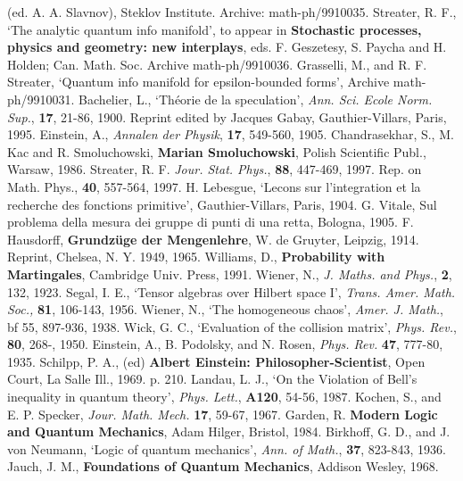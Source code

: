 \begin{thebibliography}{99}
(ed. A. A. Slavnov), Steklov Institute. Archive: math-ph/9910035.
 Streater, R. F., `The analytic quantum info manifold',
to appear in {\bf Stochastic processes, physics and geometry: new
interplays}, eds. F. Geszetesy, S. Paycha and H. Holden; Can. Math. Soc.
Archive math-ph/9910036.
 Grasselli, M., and R. F. Streater, `Quantum info manifold
for epsilon-bounded forms', Archive math-ph/9910031.
 Bachelier, L., `Th\'{e}orie de la speculation',
{\em Ann. Sci. Ecole Norm. Sup.}, {\bf 17}, 21-86, 1900. Reprint
edited by Jacques Gabay, Gauthier-Villars, Paris, 1995.
 Einstein, A., {\em Annalen der Physik}, {\bf 17}, 549-560,
1905.
 Chandrasekhar, S., M. Kac and R. Smoluchowski, {\bf
Marian Smoluchowski}, Polish Scientific Publ., Warsaw, 1986.
 Streater, R. F. {\em Jour. Stat. Phys.}, {\bf 88}, 447-469,
1997. Rep. on Math. Phys., {\bf 40}, 557-564, 1997.
 H. Lebesgue, `Lecons sur l'integration et la
recherche des fonctions primitive', Gauthier-Villars, Paris, 1904.
 G. Vitale, Sul problema della mesura dei gruppe di
punti di una retta, Bologna, 1905.
 F. Hausdorff, {\bf Grundz\"{u}ge der Mengenlehre},
W. de Gruyter, Leipzig, 1914. Reprint, Chelsea, N. Y. 1949, 1965.
 Williams, D., {\bf Probability with Martingales},
Cambridge Univ. Press, 1991.
 Wiener, N., {\em J. Maths. and Phys.}, {\bf 2},
132, 1923.
 Segal, I. E., `Tensor algebras over Hilbert space I',
{\em Trans. Amer. Math. Soc.,} {\bf 81}, 106-143, 1956.
 Wiener, N., `The homogeneous chaos', {\em Amer.
J. Math.}, {bf 55}, 897-936, 1938.
 Wick, G. C., `Evaluation of the collision matrix',
{\em Phys. Rev.}, {\bf 80}, 268-, 1950.
 Einstein, A., B. Podolsky, and N. Rosen, {\em Phys.
Rev.} {\bf 47}, 777-80, 1935.
 Schilpp, P. A., (ed) {\bf Albert Einstein:
Philosopher-Scientist}, Open Court, La Salle Ill., 1969. p. 210.
 Landau, L. J., `On the Violation of Bell's inequality
in quantum theory', {\em Phys. Lett.}, {\bf A120}, 54-56, 1987.
 Kochen, S., and E. P. Specker, {\em Jour. Math. Mech.}
{\bf 17}, 59-67, 1967.
 Garden, R. {\bf Modern Logic and Quantum Mechanics}, Adam
Hilger, Bristol, 1984.
 Birkhoff, G. D., and J. von Neumann, `Logic of
 quantum mechanics', {\em Ann. of Math.}, {\bf 37}, 823-843, 1936.
 Jauch, J. M., {\bf Foundations of Quantum Mechanics},
Addison Wesley, 1968.

\end{thebibliography}
